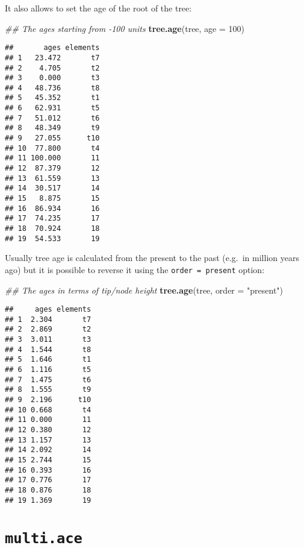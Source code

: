 \documentclass[
]{book}
\newenvironment{Shaded}{\begin{snugshade}}{\end{snugshade}}
\newcommand{\CommentTok}[1]{\textcolor[rgb]{0.56,0.35,0.01}{\textit{#1}}}
\newcommand{\DataTypeTok}[1]{\textcolor[rgb]{0.13,0.29,0.53}{#1}}
\newcommand{\DecValTok}[1]{\textcolor[rgb]{0.00,0.00,0.81}{#1}}
\newcommand{\KeywordTok}[1]{\textcolor[rgb]{0.13,0.29,0.53}{\textbf{#1}}}
\newcommand{\NormalTok}[1]{#1}
\newcommand{\StringTok}[1]{\textcolor[rgb]{0.31,0.60,0.02}{#1}}
\begin{document}
It also allows to set the age of the root of the tree:

\begin{Shaded}
\begin{Highlighting}[]
\CommentTok{\#\# The ages starting from {-}100 units}
\KeywordTok{tree.age}\NormalTok{(tree, }\DataTypeTok{age =} \DecValTok{100}\NormalTok{)}
\end{Highlighting}
\end{Shaded}

\begin{verbatim}
##       ages elements
## 1   23.472       t7
## 2    4.705       t2
## 3    0.000       t3
## 4   48.736       t8
## 5   45.352       t1
## 6   62.931       t5
## 7   51.012       t6
## 8   48.349       t9
## 9   27.055      t10
## 10  77.800       t4
## 11 100.000       11
## 12  87.379       12
## 13  61.559       13
## 14  30.517       14
## 15   8.875       15
## 16  86.934       16
## 17  74.235       17
## 18  70.924       18
## 19  54.533       19
\end{verbatim}

Usually tree age is calculated from the present to the past (e.g.~in million years ago) but it is possible to reverse it using the \texttt{order\ =\ present} option:

\begin{Shaded}
\begin{Highlighting}[]
\CommentTok{\#\# The ages in terms of tip/node height}
\KeywordTok{tree.age}\NormalTok{(tree, }\DataTypeTok{order =} \StringTok{"present"}\NormalTok{)}
\end{Highlighting}
\end{Shaded}

\begin{verbatim}
##     ages elements
## 1  2.304       t7
## 2  2.869       t2
## 3  3.011       t3
## 4  1.544       t8
## 5  1.646       t1
## 6  1.116       t5
## 7  1.475       t6
## 8  1.555       t9
## 9  2.196      t10
## 10 0.668       t4
## 11 0.000       11
## 12 0.380       12
## 13 1.157       13
## 14 2.092       14
## 15 2.744       15
## 16 0.393       16
## 17 0.776       17
## 18 0.876       18
## 19 1.369       19
\end{verbatim}

\hypertarget{multi.ace}{%
\section{\texorpdfstring{\texttt{multi.ace}}{multi.ace}}\label{multi.ace}}
\end{document}
